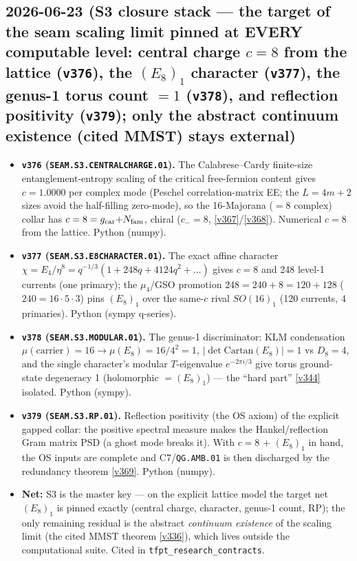 \subsection*{2026-06-23 (S3 closure stack --- the target of the seam scaling limit pinned at EVERY computable level: central charge $c{=}8$ from the lattice (\texttt{v376}), the $(E_8)_1$ character (\texttt{v377}), the genus-1 torus count $=1$ (\texttt{v378}), and reflection positivity (\texttt{v379}); only the abstract continuum existence (cited MMST) stays external)}
\begin{itemize}
\item \textbf{\texttt{v376} (\texttt{SEAM.S3.CENTRALCHARGE.01}).} The Calabrese--Cardy finite-size
entanglement-entropy scaling of the critical free-fermion content gives $c=1.0000$ per complex mode
(Peschel correlation-matrix EE; the $L{=}4m{+}2$ sizes avoid the half-filling zero-mode), so the
16-Majorana ($=8$ complex) collar has $c=8=g_{\mathrm{car}}{+}N_{\mathrm{fam}}$, chiral ($c_-{=}8$, \vref{v367}/\vref{v368}).
Numerical $c{=}8$ from the lattice. Python (numpy).
\item \textbf{\texttt{v377} (\texttt{SEAM.S3.E8CHARACTER.01}).} The exact affine character
$\chi = E_4/\eta^8 = q^{-1/3}(1 + 248q + 4124q^2 + \dots)$ gives $c = 8$ and 248 level-1 currents (one
primary); the $\mu_4$/GSO promotion $248 = 240 + 8 = 120 + 128$ ($240 = 16{\cdot}5{\cdot}3$) pins $(E_8)_1$
over the same-$c$ rival $SO(16)_1$ (120 currents, 4 primaries). Python (sympy q-series).
\item \textbf{\texttt{v378} (\texttt{SEAM.S3.MODULAR.01}).} The genus-1 discriminator: KLM condensation
$\mu(\text{carrier}){=}16\to\mu(E_8){=}16/4^2{=}1$, $|\det\mathrm{Cartan}(E_8)|{=}1$ vs $D_8{=}4$, and the
single character's modular $T$-eigenvalue $e^{-2\pi i/3}$ give torus ground-state degeneracy 1 (holomorphic
$=(E_8)_1$) --- the ``hard part'' \vref{v344} isolated. Python (sympy).
\item \textbf{\texttt{v379} (\texttt{SEAM.S3.RP.01}).} Reflection positivity (the OS axiom) of the explicit
gapped collar: the positive spectral measure makes the Hankel/reflection Gram matrix PSD (a ghost mode
breaks it). With $c{=}8$ $+$ $(E_8)_1$ in hand, the OS inputs are complete and C7/\texttt{QG.AMB.01} is then
discharged by the redundancy theorem \vref{v369}. Python (numpy).
\item \textbf{Net:} S3 is the master key --- on the explicit lattice model the target net $(E_8)_1$ is pinned
exactly (central charge, character, genus-1 count, RP); the only remaining residual is the abstract
\emph{continuum existence} of the scaling limit (the cited MMST theorem \vref{v336}), which lives outside the
computational suite. Cited in \texttt{tfpt\_research\_contracts}.
\end{itemize}

